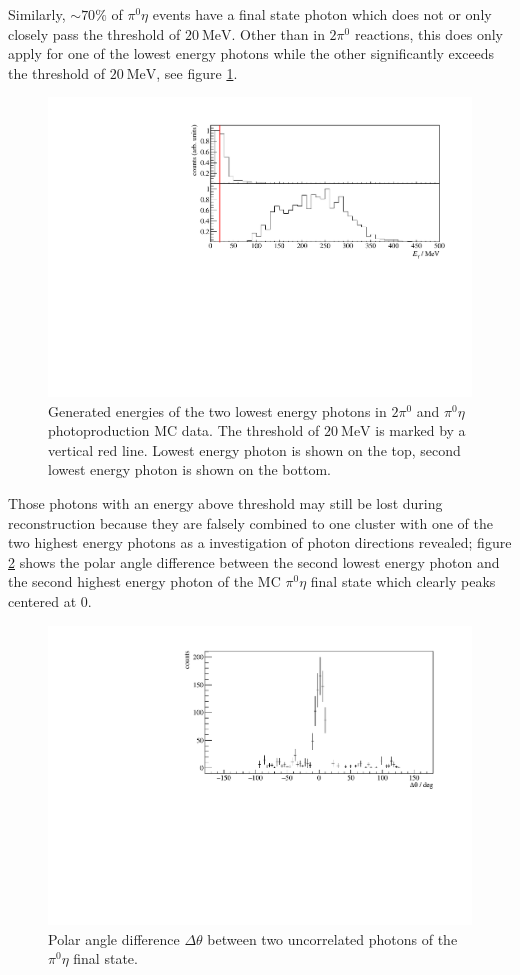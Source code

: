  Similarly, $\sim70\%$ of $\pi^0\eta$ events have a final state photon which does not or only closely pass the threshold of $\SI{20}{\mega\eV}$. Other than in $2\pi^0$ reactions, this does only apply for one of the lowest energy photons while the other significantly exceeds the threshold of $\SI{20}{\mega\eV}$, see figure \ref{fig:mcgammas_b}. 
 \begin{figure}[htbp]
 	\centering
 	\includegraphics[width=\linewidth]{../figs/hydrogen/mcgammas_pi0eta.pdf}
 	\caption{Generated energies of the two lowest energy photons in $2\pi^0$ and $\pi^0\eta$ photoproduction MC data. The threshold of $\SI{20}{\mega\eV}$ is marked by a vertical red line. Lowest energy photon is shown on the top, second lowest energy photon is shown on the bottom.}
 	\label{fig:mcgammas_b}			
 \end{figure}
 Those photons with an energy above threshold may still be lost during reconstruction because they are falsely combined to one cluster with one of the two highest energy photons as a investigation of photon directions revealed; figure \ref{fig:mcangle} shows the polar angle difference between the second lowest energy photon and the second highest energy photon of the MC $\pi^0\eta$ final state which clearly peaks centered at $0$. 
\begin{figure}[htbp]
	\centering
	\includegraphics[width=\linewidth]{../figs/hydrogen/mcgammas_td_pi0eta.pdf}
	\caption{Polar angle difference $\Delta\theta$ between two uncorrelated photons of the $\pi^0\eta$ final state.}
	\label{fig:mcangle}
\end{figure}
